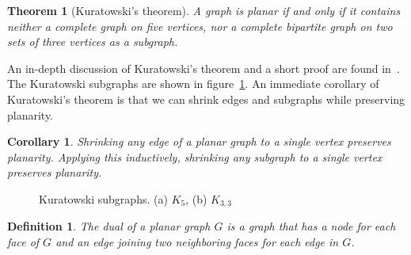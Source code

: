\documentclass[11pt]{article}
\newtheorem{definition}{Definition}[section]
\newtheorem{theorem}{Theorem}[section]
\newtheorem{corollary}{Corollary}[theorem]
\begin{document}
\begin{theorem}[Kuratowski's theorem]
  A graph is planar if and only if it contains neither a complete graph on five vertices, nor a complete bipartite graph on two sets of three vertices as a subgraph.
\end{theorem}

An in-depth discussion of Kuratowski's theorem and a short proof are found in~\cite{thomassen1981kuratowski}. The Kuratowski subgraphs are shown in figure~\ref{fig:kuratowski}. An immediate corollary of Kuratowski's theorem is that we can shrink edges and subgraphs while preserving planarity.\\

\begin{corollary}
  Shrinking any edge of a planar graph to a single vertex preserves planarity. Applying this inductively, shrinking any subgraph to a single vertex preserves planarity.\\
\end{corollary}

\begin{figure}[!htb]
  \centering
  \hfil
  \caption{Kuratowski subgraphs. (a) $K_5$, (b) $K_{3,3}$}
  \label{fig:kuratowski}
\end{figure}

\begin{definition}
  The dual of a planar graph $G$ is a graph that has a node for each face of $G$ and an edge joining two neighboring faces for each edge in $G$.\\
\end{definition}
\end{document}
